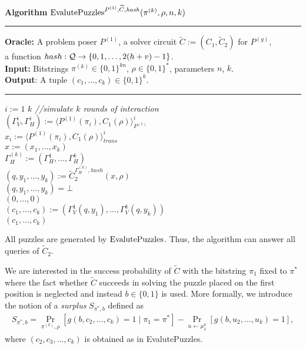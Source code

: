 \begin{codeblock}
  \textbf{Algorithm} $\operatorname{\text{EvalutePuzzles}}^{P^{(1)}, \widetilde{C}, \operatorname{\mathit{hash}}}(\pi^{(k)}, \rho, n, k)$
  \medskip \hrule
  \textbf{Oracle:}  A problem poser $P^{(1)}$, a solver circuit $\widetilde{C} := (C_1, \widetilde{C}_2)$ for $P^{(g)}$,\\
  \IndII a function $hash : \mathcal{Q} \rightarrow \{0,1,\dots, 2(h+v)-1\}$.\\
  \textbf{Input:} Bitstrings $\pi^{(k)} \in \{0,1\}^{kn}$, $\rho \in \{0,1\}^{*}$, parameters $n$, $k$.\\
  \textbf{Output}: A tuple $(c_1, \dots, c_k) \in \{0,1\}^{k}$.
  \medskip\hrule
  \For $i:=1$ \To $k$ \Do \IndII \textit{//simulate $k$ rounds of interaction} \\
  \IndI $(\Gamma_V^{i}, \Gamma_H^{i}) := \langle P^{(1)}(\pi_i), C_1(\rho) \rangle_{P^{(1)}}^i$\\
  \IndI $x_i := \langle P^{(1)}(\pi_i), C_1(\rho) \rangle^i_{\mathit{trans}}$ \\
  $x := (x_1, \dots, x_k)$ \\
  $\Gamma_H^{(k)} := (\Gamma_H^1, \dotsc, \Gamma_H^k)$ \\
  $(q, y_1, \dots, y_k) := \widetilde{C}_2^{\Gamma_H^{(k)}, hash} (x, \rho)$ \\
  \If $(q, y_1, \dots, y_k) = \bot$ \Then \\
  \IndI \Return $(0, \dotsc, 0)$ \\
  $(c_1, \dotsc, c_k) := (\Gamma_V^{1}(q, y_1), \dotsc, \Gamma_V^{k}(q, y_k))$\\
  \Return $(c_1, \dotsc, c_k)$
\end{codeblock}
%
All puzzles are generated  by $\operatorname{\text{EvalutePuzzles}}$. Thus, the algorithm can answer all queries of $\widetilde{C}_2$.

We are interested in the success probability of $\widetilde{C}$ with the bitstring $\pi_1$ fixed to $\pi^*$ where
the fact whether $\widetilde{C}$ succeeds in solving the puzzle placed on the first position is neglected
and instead $b \in \{0,1\}$ is used. More formally, we introduce the notion of a \textit{surplus} $S_{\pi^*, b}$ defined as
\begin{align}
  \label{eq:s_pi_b}
S_{\pi^*, b} = \underset{\pi^{(k)}, \rho}{\Pr}\left[g(b, c_2, \dots, c_k) = 1 \mid \pi_1 = \pi^*\right] - \underset{u \leftarrow \mu^{k}_{\delta}}{\Pr}\left[g(b, u_2, \dots, u_k) = 1\right],
\end{align}
where $(c_2, c_3, \dotsc, c_k)$ is obtained as in EvalutePuzzles.

